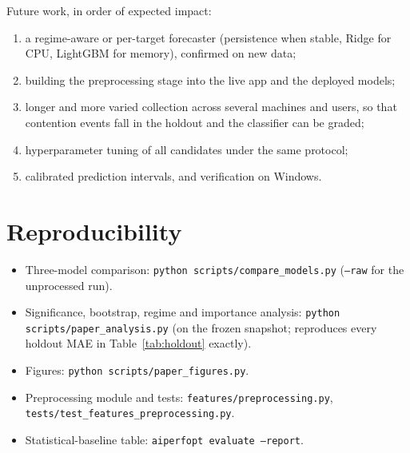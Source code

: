 \documentclass[conference]{IEEEtran}
\begin{document}
Future work, in order of expected impact:
\begin{enumerate}
  \item a regime-aware or per-target forecaster (persistence when stable,
        Ridge for CPU, LightGBM for memory), confirmed on new data;
  \item building the preprocessing stage into the live app and the deployed
        models;
  \item longer and more varied collection across several machines and users,
        so that contention events fall in the holdout and the classifier can
        be graded;
  \item hyperparameter tuning of all candidates under the same protocol;
  \item calibrated prediction intervals, and verification on Windows.
\end{enumerate}

\section*{Reproducibility}
{\raggedright
\begin{itemize}
  \item Three-model comparison: \texttt{python scripts/compare\_models.py}
        (\texttt{--raw} for the unprocessed run).
  \item Significance, bootstrap, regime and importance analysis:
        \texttt{python scripts/paper\_analysis.py} (on the frozen snapshot;
        reproduces every holdout MAE in Table~\ref{tab:holdout} exactly).
  \item Figures: \texttt{python scripts/paper\_figures.py}.
  \item Preprocessing module and tests:
        \texttt{features/preprocessing.py},
        \texttt{tests/test\_features\_preprocessing.py}.
  \item Statistical-baseline table: \texttt{aiperfopt evaluate --report}.
\end{itemize}
}
\end{document}
